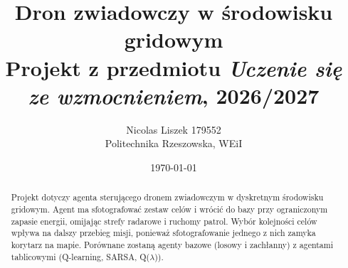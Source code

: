 \documentclass[11pt,a4paper]{article}
\title{Dron zwiadowczy w środowisku gridowym\\
  \large Projekt z przedmiotu \emph{Uczenie się ze wzmocnieniem}, 2026/2027}
\author{{Nicolas Liszek 179552}\\Politechnika Rzeszowska, WEiI}
\date{\today}
\begin{document}
\maketitle

\begin{abstract}
Projekt dotyczy agenta sterującego dronem zwiadowczym w dyskretnym środowisku
gridowym. Agent ma sfotografować zestaw celów i wrócić do bazy przy
ograniczonym zapasie energii, omijając strefy radarowe i ruchomy patrol.
Wybór kolejności celów wpływa na dalszy przebieg misji, ponieważ sfotografowanie
jednego z nich zamyka korytarz na mapie. Porównane zostaną agenty bazowe
(losowy i zachłanny) z agentami tablicowymi (Q-learning, SARSA, Q($\lambda$)).
\end{abstract}

\tableofcontents




% 
% 
% 
% 
% 
% 
% 




\end{document}
